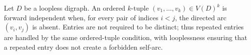 \begin{definition}
Let $D$ be a loopless digraph.  An ordered $k$-tuple
$(v_1,\ldots,v_k)\in V(D)^k$ is forward independent when, for every pair of
indices $i<j$, the directed arc $(v_i,v_j)$ is absent.  Entries are not
required to be distinct; thus repeated entries are handled by the same
ordered-tuple condition, with looplessness ensuring that a repeated entry
does not create a forbidden self-arc.
\end{definition}
